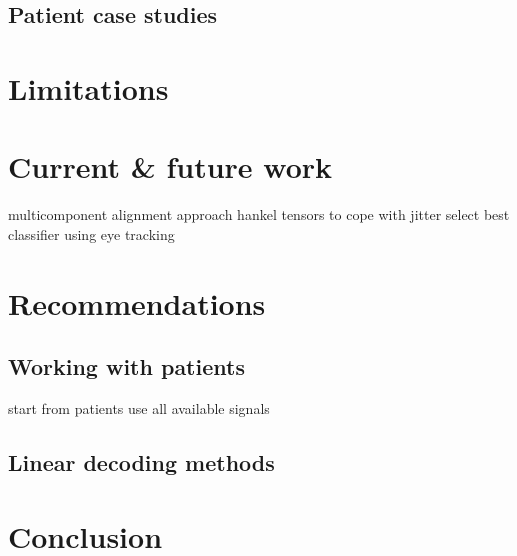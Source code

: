 \subsection{Patient case studies}

\section{Limitations}

\section{Current \& future work}
multicomponent alignment approach
hankel tensors to cope with jitter
select best classifier using eye tracking

\section{Recommendations}
\subsection{Working with patients}
start from patients
use all available signals
\subsection{Linear decoding methods}

\section{Conclusion}
